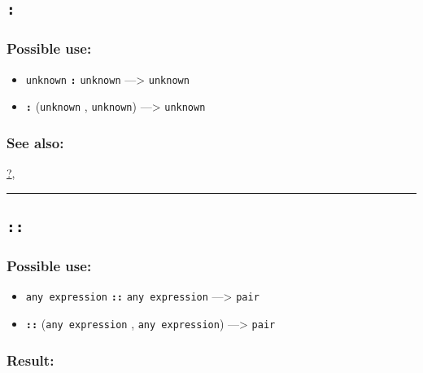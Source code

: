 \documentclass[]{book}
\providecommand{\tightlist}{%
  \setlength{\itemsep}{0pt}\setlength{\parskip}{0pt}}
\theoremstyle{definition}
\theoremstyle{definition}
\theoremstyle{definition}
\theoremstyle{remark}
\begin{document}
\subsection{\texorpdfstring{\texttt{:}}{:}}\label{section-2}

\subsubsection{Possible use:}\label{possible-use-1}

\begin{itemize}
\tightlist
\item
  \texttt{unknown} \textbf{\texttt{:}} \texttt{unknown}
  ---\textgreater{} \texttt{unknown}
\item
  \textbf{\texttt{:}} (\texttt{unknown} , \texttt{unknown})
  ---\textgreater{} \texttt{unknown}
\end{itemize}

\subsubsection{See also:}\label{see-also-1}

\href{operators-a-to-a.html\#?}{?},

\begin{center}\rule{0.5\linewidth}{\linethickness}\end{center}

\subsection{\texorpdfstring{\texttt{::}}{::}}\label{section-3}

\subsubsection{Possible use:}\label{possible-use-2}

\begin{itemize}
\tightlist
\item
  \texttt{any\ expression} \textbf{\texttt{::}} \texttt{any\ expression}
  ---\textgreater{} \texttt{pair}
\item
  \textbf{\texttt{::}} (\texttt{any\ expression} ,
  \texttt{any\ expression}) ---\textgreater{} \texttt{pair}
\end{itemize}

\subsubsection{Result:}\label{result-1}
\end{document}
